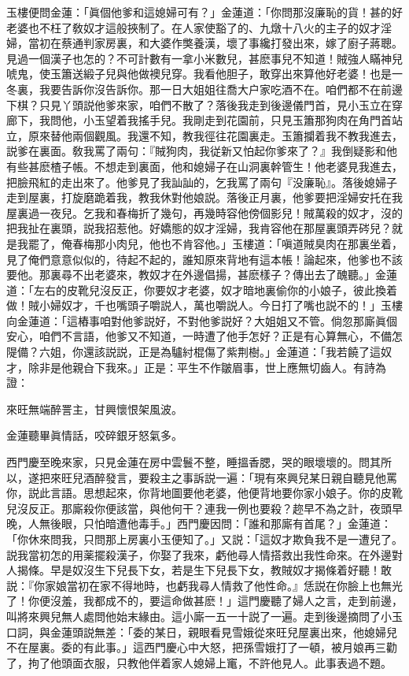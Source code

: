 玉樓便問金蓮：「眞個他爹和這媳婦可有？」金蓮道：「你問那沒廉恥的貨！甚的好老婆也不枉了敎奴才這般挾制了。在人家使豁了的、九燉十八火的主子的奴才淫婦，當初在蔡通判家房裏，和大婆作獘養漢，壞了事纔打發出來，嫁了廚子蔣聰。見過一個漢子也怎的？不可計數有一拿小米數兒，甚麽事兒不知道！賊強人瞞神兒唬鬼，使玉簫送緞子兒與他做襖兒穿。我看他胆子，敢穿出來算他好老婆！也是一冬裏，我要告訴你沒告訴你。那一日大姐姐往喬大户家吃酒不在。咱們都不在前邊下棋？只見丫頭説他爹來家，咱們不散了？落後我走到後邊儀門首，見小玉立在穿廊下，我問他，小玉望着我搖手兒。我剛走到花園前，只見玉簫那狗肉在角門首站立，原來替他兩個觀風。我還不知，教我徑往花園裏走。玉簫攔着我不教我進去，説爹在裏面。敎我罵了兩句：『賊狗肉，我従新又怕起你爹來了？』我倒疑影和他有些甚麽楂子帳。不想走到裏面，他和媳婦子在山洞裏幹管生！他老婆見我進去，把臉飛紅的走出來了。他爹見了我訕訕的，乞我罵了兩句『没廉恥』。落後媳婦子走到屋裏，打旋磨跪着我，教我休對他娘説。落後正月裏，他爹要把淫婦安托在我屋裏過一夜兒。乞我和春梅折了幾句，再幾時容他傍個影兒！賊萬殺的奴才，沒的把我扯在裏頭，説我招惹他。好嬌態的奴才淫婦，我肯容他在那屋裏頭弄硶兒？就是我罷了，俺春梅那小肉兒，他也不肯容他。」玉樓道：「嗔道賊臭肉在那裏坐着，見了俺們意意似似的，待起不起的，誰知原來背地有這本帳！論起來，他爹也不該要他。那裏尋不出老婆來，教奴才在外邊倡揚，甚麽樣子？傳出去了醜聽。」金蓮道：「左右的皮靴兒沒反正，你要奴才老婆，奴才暗地裏偷你的小娘子，彼此換着做！賊小婦奴才，千也嘴頭子嚼説人，萬也嚼説人。今日打了嘴也説不的！」玉樓向金蓮道：「這樁事咱對他爹説好，不對他爹説好？大姐姐又不管。倘忽那廝眞個安心，咱們不言語，他爹又不知道，一時遭了他手怎好？正是有心算無心，不備怎隄備？六姐，你還該説説，正是為驢紂棍傷了紫荆樹。」金蓮道：「我若饒了這奴才，除非是他親㒲下我來。」正是：平生不作皺眉事，世上應無切齒人。有詩為證：

\begin{myquote}
來旺無端醉詈主，甘興懷恨架風波。

金蓮聽畢眞情話，咬碎銀牙怒氣多。
\end{myquote}

西門慶至晚來家，只見金蓮在房中雲鬟不整，睡搵香腮，哭的眼壞壞的。問其所以，遂把來旺兒酒醉發言，要殺主之事訴説一遍：「現有來興兒某日親自聽見他罵你，説此言語。思想起來，你背地圖要他老婆，他便背地要你家小娘子。你的皮靴兒沒反正。那廝殺你便該當，與他何干？連我一例也要殺？趂早不為之計，夜頭早晚，人無後眼，只怕暗遭他毒手。」西門慶因問：「誰和那廝有首尾？」金蓮道：「你休來問我，只問那上房裏小玉便知了。」又説：「這奴才欺負我不是一遭兒了。説我當初怎的用薬擺殺漢子，你娶了我來，虧他尋人情搭救出我性命來。在外邊對人揭條。早是奴沒生下兒長下女，若是生下兒長下女，教賊奴才揭條着好聽！敢説：『你家娘當初在家不得地時，也虧我尋人情救了他性命。』恁説在你臉上也無光了！你便沒羞，我都成不的，要這命做甚麽！」這門慶聽了婦人之言，走到前邊，叫將來興兒無人處問他始末緣由。這小廝一五一十説了一遍。走到後邊摘問了小玉口詞，與金蓮頭説無差：「委的某日，親眼看見雪娥從來旺兒屋裏出來，他媳婦兒不在屋裏。委的有此事。」這西門慶心中大怒，把孫雪娥打了一頓，被月娘再三勸了，拘了他頭面衣服，只教他伴着家人媳婦上竃，不許他見人。此事表過不題。

